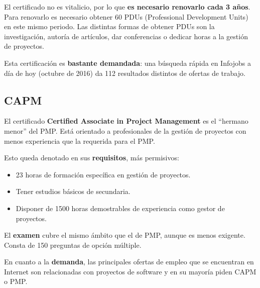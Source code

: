 El certificado no es vitalicio, por lo que \textbf{es necesario renovarlo cada 3 años}. Para renovarlo es necesario obtener 60 PDUs (Professional Development Units) en este mismo periodo. Las distintas formas de obtener PDUs son la investigación, autoría de artículos, dar conferencias o dedicar horas a la gestión de proyectos.

Esta certificación es \textbf{bastante demandada}: una búsqueda rápida en Infojobs a día de hoy (octubre de 2016) da 112 resultados distintos de ofertas de trabajo.

\subsection{CAPM}

El certificado \textbf{Certified Associate in Project Management} es el ``hermano menor'' del PMP. Está orientado a profesionales de la gestión de proyectos con menos experiencia que la requerida para el PMP.

Esto queda denotado en sus \textbf{requisitos}, más permisivos:

\begin{itemize}
\item 23 horas de formación específica en gestión de proyectos.
\item Tener estudios básicos de secundaria.
\item Disponer de 1500 horas demostrables de experiencia como gestor de proyectos.
\end{itemize}

El \textbf{examen} cubre el mismo ámbito que el de PMP, aunque es menos exigente. Consta de 150 preguntas de opción múltiple.

En cuanto a la \textbf{demanda}, las principales ofertas de empleo que se encuentran en Internet son relacionadas con proyectos de software y en su mayoría piden CAPM o PMP.
